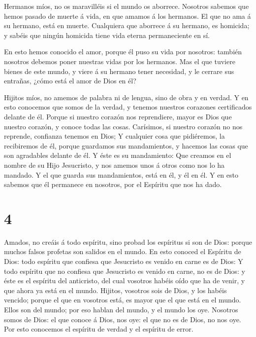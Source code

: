  Hermanos míos, no os maravilléis si el mundo os aborrece.
 Nosotros sabemos que hemos pasado de muerte á vida, en que
amamos á los hermanos. El que no ama á su hermano, está en muerte.
 Cualquiera que aborrece á su hermano, es homicida; y
sabéis que ningún homicida tiene vida eterna permaneciente en sí.

 En esto hemos conocido el amor, porque él puso su vida por
nosotros: también nosotros debemos poner nuestras vidas por los
hermanos.  Mas el que tuviere bienes de este mundo, y viere
á su hermano tener necesidad, y le cerrare sus entrañas, ¿cómo está el
amor de Dios en él?

 Hijitos míos, no amemos de palabra ni de lengua, sino de
obra y en verdad.  Y en esto conocemos que somos de la
verdad, y tenemos nuestros corazones certificados delante de él.
 Porque si nuestro corazón nos reprendiere, mayor es Dios
que nuestro corazón, y conoce todas las cosas.  Carísimos,
si nuestro corazón no nos reprende, confianza tenemos en Dios;
 Y cualquier cosa que pidiéremos, la recibiremos de él,
porque guardamos sus mandamientos, y hacemos las cosas que son
agradables delante de él.  Y éste es su mandamiento: Que
creamos en el nombre de su Hijo Jesucristo, y nos amemos unos á otros
como nos lo ha mandado.  Y el que guarda sus mandamientos,
está en él, y él en él. Y en esto sabemos que él permanece en nosotros,
por el Espíritu que nos ha dado.

\hypertarget{section-3}{%
\section{4}\label{section-3}}

 Amados, no creáis á todo espíritu, sino probad los
espíritus si son de Dios: porque muchos falsos profetas son salidos en
el mundo.  En esto conoced el Espíritu de Dios: todo
espíritu que confiesa que Jesucristo es venido en carne es de Dios:
 Y todo espíritu que no confiesa que Jesucristo es venido en
carne, no es de Dios: y éste es el espíritu del anticristo, del cual
vosotros habéis oído que ha de venir, y que ahora ya está en el mundo.
 Hijitos, vosotros sois de Dios, y los habéis vencido;
porque el que en vosotros está, es mayor que el que está en el mundo.
 Ellos son del mundo; por eso hablan del mundo, y el mundo
los oye.  Nosotros somos de Dios: el que conoce á Dios, nos
oye: el que no es de Dios, no nos oye. Por esto conocemos el espíritu de
verdad y el espíritu de error.

